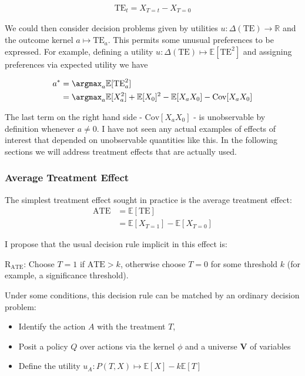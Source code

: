 \begin{align}
    \text{TE}_{t} = X_{T=t} - X_{T=0}
\end{align}

We could then consider decision problems given by utilities $u:\Delta(\text{TE})\to \mathbb{R}$ and the outcome kernel $a\mapsto \text{TE}_a$. This permits some unusual preferences to be expressed. For example, defining a utility $u:\Delta(\text{TE})\mapsto \mathbb{E}[\text{TE}^2]$ and assigning preferences via expected utility we have

\begin{align}
    a^* &= \argmax_a \mathbb{E}[\text{TE}_a^2]\\
        &= \argmax_a \mathbb{E}[X_a^2]+\mathbb{E}[X_0]^2 - \mathbb{E}[X_a X_0] - \text{Cov}[X_a X_0]
\end{align}

The last term on the right hand side - $\text{Cov}[X_a X_0]$ - is unobservable by definition whenever $a\neq 0$. I have not seen any actual examples of effects of interest that depended on unobservable quantities like this. In the following sections we will address treatment effects that are actually used.

\subsubsection{Average Treatment Effect}

The simplest treatment effect sought in practice is the average treatment effect:
\begin{align}
    \text{ATE} &= \mathbb{E}[\text{TE}]\\
               &= \mathbb{E}[X_{T=1}] - \mathbb{E}[X_{T=0}]
\end{align}

I propose that the usual decision rule implicit in this effect is: 

\textbf{$\text{R}_{\text{ATE}}$}: Choose $T=1$ if $\text{ATE}>k$, otherwise choose $T=0$ for some threshold $k$ (for example, a significance threshold).

Under some conditions, this decision rule can be matched by an ordinary decision problem:
\begin{itemize}
    \item Identify the action $A$ with the treatment $T$, 
    \item Posit a policy $Q$ over actions via the kernel $\phi$ and a universe $\mathbf{V}$ of variables
    \item Define the utility $u_A: P(T,X)\mapsto \mathbb{E}[X]-k\mathbb{E}[T]$ 
\end{itemize}

